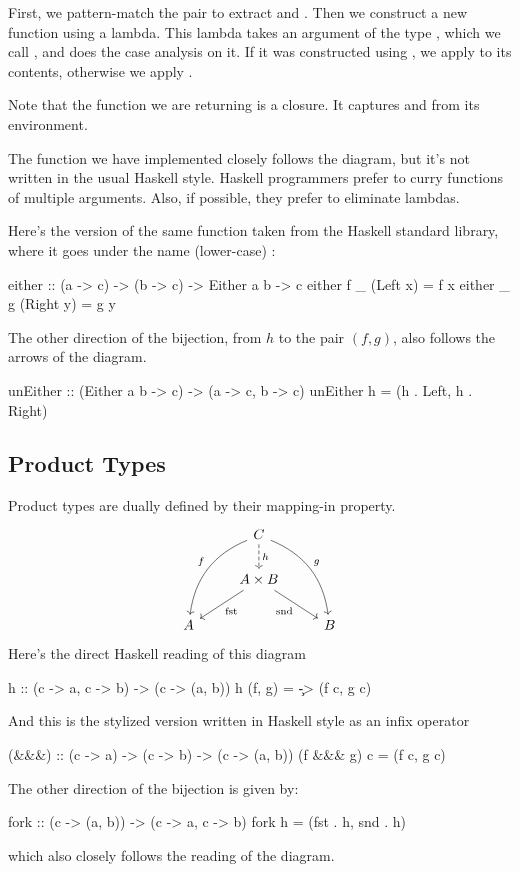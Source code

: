 \documentclass[DaoFP]{subfiles}
\begin{document}
First, we pattern-match the pair  to extract  and . Then we construct a new function using a lambda. This lambda takes an argument of the type , which we call , and does the case analysis on it. If it was constructed using , we apply  to its contents, otherwise we apply . 

Note that the function we are returning is a closure. It captures  and  from its environment. 

The function we have implemented closely follows the diagram, but it's not written in the usual Haskell style. Haskell programmers prefer to curry functions of multiple arguments. Also, if possible, they prefer to eliminate lambdas. 

Here's the version of the same function taken from the Haskell standard library, where it goes under the name (lower-case) :
\begin{haskell}
either                  :: (a -> c) -> (b -> c) -> Either a b -> c
either f _ (Left x)     =  f x
either _ g (Right y)    =  g y
\end{haskell}

The other direction of the bijection, from $h$ to the pair $(f, g)$, also follows the arrows of the diagram.
\begin{haskell}
unEither :: (Either a b -> c) -> (a -> c, b -> c)
unEither h = (h . Left, h . Right)
\end{haskell}


\subsection{Product Types}

Product types are dually defined by their mapping-in property.
\[
 \begin{tikzcd}
 & C
\arrow[d, dashed, "h"]
 \arrow[ddl, bend right, "f"']
 \arrow[ddr, bend left, "g"]
\\
&A \times B
 \arrow[dl,  "\text{fst}"]
  \arrow[dr,   "\text{snd}"']
\\
A && B
 \end{tikzcd}
\]
Here's the direct Haskell reading of this diagram
\begin{haskell}
h :: (c -> a, c -> b) -> (c -> (a, b))
h (f, g) = \c -> (f c, g c)
\end{haskell}
And this is the stylized version written in Haskell style as an infix operator \hask{&&&}
\begin{haskell}
(&&&) :: (c -> a) -> (c -> b) -> (c -> (a, b))
(f &&& g) c = (f c, g c)
\end{haskell}
The other direction of the bijection is given by:
\begin{haskell}
fork :: (c -> (a, b)) -> (c -> a, c -> b)
fork h = (fst . h, snd . h)
\end{haskell}
which also closely follows the reading of the diagram.
\end{document}
